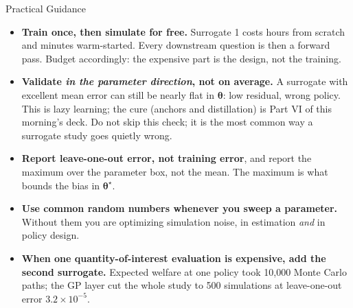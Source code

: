 \documentclass[aspectratio=169,11pt]{beamer}
\newcommand{\emphc}[1]{\textcolor{harvardcrimson}{#1}}
\newcommand{\str}{\bm{\theta}}          %
\begin{document}
\begin{frame}{Practical Guidance}
\small
\begin{itemize}\itemsep4pt
  \item \textbf{Train once, then simulate for free.} Surrogate 1 costs hours from scratch and minutes warm-started. Every downstream question is then a forward pass. Budget accordingly: the expensive part is the design, not the training.
  \item \textbf{Validate \emph{in the parameter direction}, not on average.} A surrogate with excellent mean error can still be nearly flat in $\str$: low residual, wrong policy. This is \emphc{lazy learning}; the cure (anchors and distillation) is Part VI of this morning's deck. \emphc{Do not skip this check}; it is the most common way a surrogate study goes quietly wrong.
  \item \textbf{Report leave-one-out error, not training error}, and report the \emphc{maximum} over the parameter box, not the mean. The maximum is what bounds the bias in $\str^\star$.
  \item \textbf{Use common random numbers whenever you sweep a parameter.} Without them you are optimizing simulation noise, in estimation \emph{and} in policy design.
  \item \textbf{When one quantity-of-interest evaluation is expensive, add the second surrogate.} Expected welfare at one policy took 10{,}000 Monte Carlo paths; the GP layer cut the whole study to 500 simulations at leave-one-out error $3.2\times10^{-5}$.
\end{itemize}
\end{frame}
\end{document}
